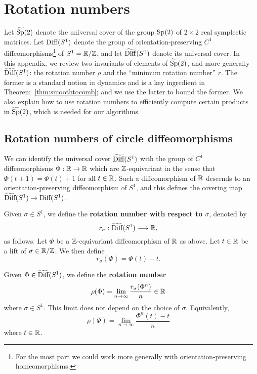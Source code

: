 

\section{Rotation numbers}
\label{app:rotation_numbers} 

Let $\widetilde{\text{Sp}}(2)$ denote the universal cover of the group $\text{Sp}(2)$ of $2\times 2$ real symplectic matrices. Let $\operatorname{Diff}(S^1)$ denote the group of orientation-preserving $C^1$ diffeomorphisms\footnote{For the most part we could work more generally with orientation-preserving homeomorphisms.} of $S^1={\mathbb R}/{\mathbb Z}$, and let $\widetilde{\operatorname{Diff}}(S^1)$ denote its universal cover. In this appendix, we review two invariants of elements of $\widetilde{\text{Sp}}(2)$, and more generally $\widetilde{\operatorname{Diff}}(S^1)$: the rotation number $\rho$ and the ``minimum rotation number'' $r$. The former is a standard notion in dynamics and is a key ingredient in Theorem~\ref{thm:smoothtocomb}; and we use the latter to bound the former.  We also explain how to use rotation numbers to efficiently compute certain products in $\widetilde{\text{Sp}}(2)$, which is needed for our algorithms.

\subsection{Rotation numbers of circle diffeomorphisms} \label{subsubsec:the_dynamical_rotation_number_of_circle_diffeomorphisms}

We can identify the universal cover $\widetilde{\text{Diff}}(S^1)$ with the group of $C^1$ diffeomorphisms $\Phi:{\mathbb R}\to{\mathbb R}$ which are ${\mathbb Z}$-equivariant in the sense that $\Phi(t+1)=\Phi(t)+1$ for all $t\in{\mathbb R}$. Such a diffeomorphism of ${\mathbb R}$ descends to an orientation-preserving diffeomorphism of $S^1$, and this defines the covering map $\widetilde{\text{Diff}}(S^1)\to\text{Diff}(S^1)$.

\begin{definition}
\label{def:dynamical_rotation_number_for_S1}
Given $\sigma\in S^1$, we define the {\bf rotation number with respect to $\sigma$\/}, denoted by
\[
r_\sigma:\widetilde{\text{Diff}}(S^1) \longrightarrow {\mathbb R},
\]
as follows. Let $\Phi$ be a ${\mathbb Z}$-equivariant diffeomorphism of ${\mathbb R}$ as above. Let $t\in{\mathbb R}$ be a lift of $\sigma\in{\mathbb R}/{\mathbb Z}$. We then define
\begin{equation}
\label{eqn:def_of_dynamical_rotation_wrts}
r_\sigma(\Phi) = \Phi(t) - t.
\end{equation}
\end{definition}

\begin{definition}
Given $\Phi\in\widetilde{\text{Diff}}(S^1)$, we define the {\bf rotation number\/}
\begin{equation}
\label{eqn:defrhophi}
\rho(\Phi) = \lim_{n\to\infty}\frac{r_\sigma(\Phi^n)}{n} \in {\mathbb R}
\end{equation}
where $\sigma\in S^1$. This limit does not depend on the choice of $\sigma$. Equivalently,
\begin{equation}
\label{eqn:defrhophi2}
\rho(\Phi) = \lim_{n\to\infty}\frac{\Phi^n(t)-t}{n}
\end{equation}
where $t\in{\mathbb R}$.
\end{definition}

